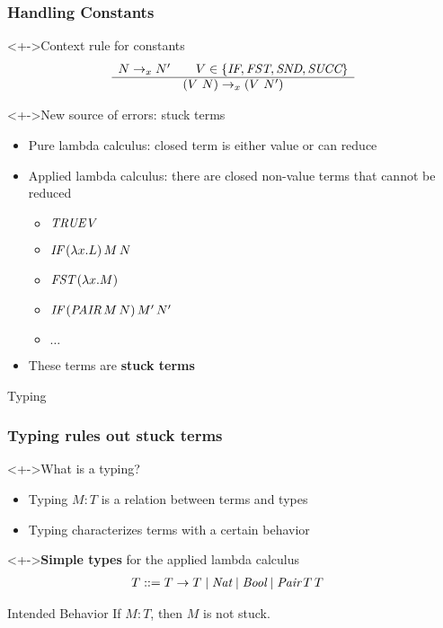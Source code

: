 \documentclass[pdftex,aspectratio=169]{beamer}
\begin{document}
\begin{frame}[fragile]
  \frametitle{Handling Constants}
  \begin{block}<+->{Context rule for constants}%
    \begin{displaymath}
      \begin{array}{c}
        N \rightarrow_x N'
        \qquad V \in \{ \textit{IF}, \textit{FST}, \textit{SND}, \textit{SUCC} \}
        \\\hline
        (V~N) \rightarrow_x (V~N')
      \end{array}
    \end{displaymath}
  \end{block}
  
  
  \begin{block}<+->{New source of errors: stuck terms}
    \begin{itemize}
    \item Pure lambda calculus: closed term is either value or can reduce
    \item Applied lambda calculus: there are closed non-value terms that cannot be reduced
      \begin{itemize}
      \item $\textit{TRUE}\,V$ 
      \item $\textit{IF}\,(\lambda x.L)\, M\, N$
      \item $\textit{FST}\,(\lambda x.M)$
      \item $\textit{IF}\,(\textit{PAIR}\, M\, N)\, M'\, N'$
      \item $\dots$
      \end{itemize}
    \item These terms are \textbf{stuck terms}
    \end{itemize}
  \end{block}
\end{frame}

\begin{frame}
  \fontsize{1.5cm}{1.6cm}\selectfont\centering{}%
  Typing
\end{frame}

\begin{frame}[fragile]
  \frametitle{Typing rules out stuck terms }
  \begin{alertblock}<+->{What is a typing?}
    \begin{itemize}
    \item Typing $M:T$ is a relation between terms and types
    \item Typing characterizes terms with a certain behavior
  \end{itemize}
  \end{alertblock}
  \begin{alertblock}<+->{\textbf{Simple types} for the applied lambda calculus}
    \begin{align*}
      T &::= T \to T \mid \textit{Nat} \mid \textit{Bool} \mid \textit{Pair}\,T\,T
    \end{align*}
    \begin{block}{Intended Behavior}
      If $M:T$, then $M$ is not stuck.
    \end{block}
  \end{alertblock}
\end{frame}
\end{document}
